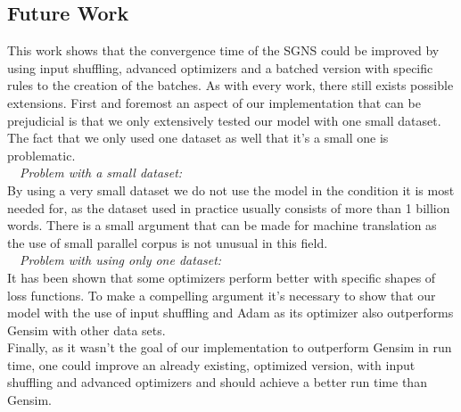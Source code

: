 \subsection{Future Work}
This work shows that the convergence time of the SGNS could be improved by using input shuffling, advanced optimizers and a batched version with specific rules to the creation of the batches. As with every work, there still exists possible extensions. First and foremost an aspect of our implementation that can be prejudicial is that we only extensively tested our model with one small dataset. The fact that we only used one dataset as well that it's a small one is problematic. \\ 
~~\textit{Problem with a small dataset:} \\ By using a very small dataset we do not use the model in the condition it is most needed for, as the dataset used in practice usually consists of more than 1 billion words. There is a small argument that can be made for machine translation as the use of small parallel corpus is not unusual in this field. \\
~~\textit{Problem with using only one dataset:}\\
It has been shown that some optimizers perform better with specific shapes of loss functions. To make a compelling argument it's necessary to show that our model with the use of input shuffling and Adam as its optimizer also outperforms Gensim with other data sets.\\
Finally, as it wasn't the goal of our implementation to outperform Gensim in run time, one could improve an already existing, optimized version, with input shuffling and advanced optimizers and should achieve a better run time than Gensim.